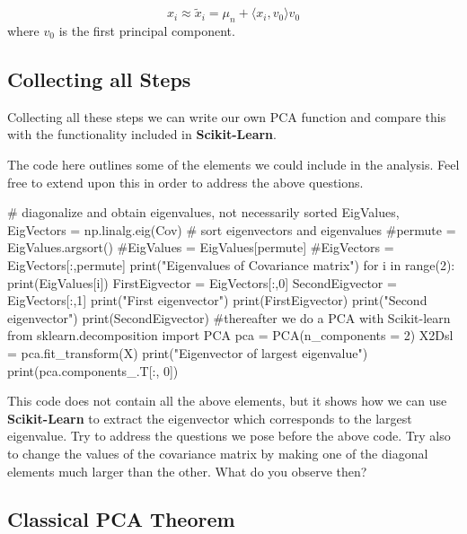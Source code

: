 \documentclass[%
oneside,                 %
final,                   %
10pt]{article}
\begin{document}
\noindent
\begin{equation*}
x_i \approx \tilde{x}_i = \mu_n + \langle x_i, v_0 \rangle v_0
\end{equation*}
where $v_0$ is the first principal component. 

\subsection{Collecting all Steps}

Collecting all these steps we can write our own PCA function and
compare this with the functionality included in \textbf{Scikit-Learn}.  

The code here outlines some of the elements we could include in the
analysis. Feel free to extend upon this in order to address the above
questions.
























\bpycod
# diagonalize and obtain eigenvalues, not necessarily sorted
EigValues, EigVectors = np.linalg.eig(Cov)
# sort eigenvectors and eigenvalues
#permute = EigValues.argsort()
#EigValues = EigValues[permute]
#EigVectors = EigVectors[:,permute]
print("Eigenvalues of Covariance matrix")
for i in range(2):
    print(EigValues[i])
FirstEigvector = EigVectors[:,0]
SecondEigvector = EigVectors[:,1]
print("First eigenvector")
print(FirstEigvector)
print("Second eigenvector")
print(SecondEigvector)
#thereafter we do a PCA with Scikit-learn
from sklearn.decomposition import PCA
pca = PCA(n_components = 2)
X2Dsl = pca.fit_transform(X)
print("Eigenvector of largest eigenvalue")
print(pca.components_.T[:, 0])


\epycod

This code does not contain all the above elements, but it shows how we can use \textbf{Scikit-Learn} to extract the eigenvector which corresponds to the largest eigenvalue. Try to address the questions we pose before the above code.  Try also to change the values of the covariance matrix by making one of the diagonal elements much larger than the other. What do you observe then? 

\subsection{Classical PCA Theorem}
\end{document}
